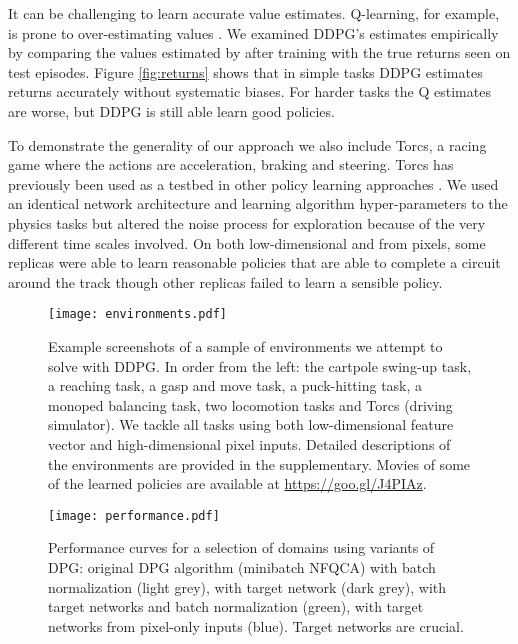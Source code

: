\documentclass{article} \usepackage{iclr2016_conference,times}
\begin{document}
It can be challenging to learn accurate value estimates. Q-learning,
for example, is prone to over-estimating values
\citep{hasselt2010double}.  We examined DDPG's estimates empirically by
comparing the values estimated by  after training with the true
returns seen on test episodes. Figure \ref{fig:returns} shows that in
simple tasks DDPG estimates returns accurately without systematic
biases. For harder tasks the Q estimates are worse, but DDPG is still
able learn good policies.





To demonstrate the generality of our approach
we also include Torcs, a racing game where the actions are acceleration,
braking
and steering. Torcs has previously been used as a testbed in other
policy learning approaches \citep{koutnik2014online}.
We used an identical network architecture and
learning algorithm hyper-parameters to the physics tasks but altered
the noise process for exploration because of the very different time
scales involved.  On both low-dimensional and from pixels, some
replicas were able to learn reasonable policies that are able to
complete a circuit around the track though other replicas failed to
learn a sensible policy.


\begin{figure}[h]
\begin{center}
  \texttt{[image: environments.pdf]}
\end{center}
\caption{ Example screenshots of a sample of environments we attempt
  to solve with DDPG. In order from the left: the cartpole swing-up
  task, a reaching task, a gasp and move task, a puck-hitting task, a
  monoped balancing task, two locomotion tasks and Torcs (driving
  simulator). We tackle all tasks using both low-dimensional feature
  vector and high-dimensional pixel inputs. Detailed descriptions of
  the environments are provided in the supplementary. Movies of some of
  the learned policies are available at \url{https://goo.gl/J4PIAz}.
  }
\label{fig:environments}
\end{figure}


\begin{figure}[h]
\begin{center}
  \texttt{[image: performance.pdf]}
\end{center}
\caption{ Performance curves for a selection of domains using variants of
  DPG: original DPG algorithm (minibatch NFQCA) with batch
  normalization (light grey), with target network (dark grey), with
  target networks and batch normalization (green), with target
  networks from pixel-only inputs (blue).  Target
  networks are crucial.  }
\label{fig:curves}
\end{figure}
\end{document}
